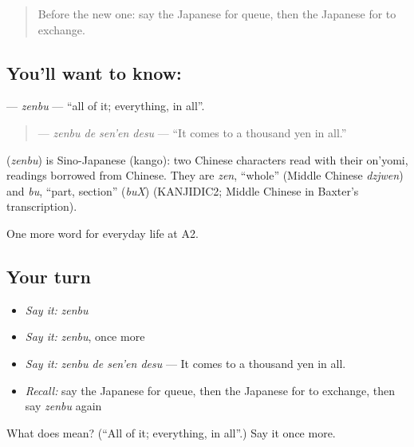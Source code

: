 \begin{quote}
Before the new one: say the Japanese for queue, then the Japanese for to exchange.
\end{quote}

\subsection*{You'll want to know: }
\textbf{} — \emph{zenbu} — \textquotedblleft{}all of it; everything, in all\textquotedblright{}.

\begin{quote}
\textbf{ } — \emph{zenbu de sen'en desu} — \textquotedblleft{}It comes to a thousand yen in all.\textquotedblright{}
\end{quote}

\begin{cousinweb}
\textbf{} (\emph{zenbu}) is Sino-Japanese (kango): two Chinese characters read with their on'yomi, readings borrowed from Chinese. They are \emph{zen}, \textquotedblleft{}whole\textquotedblright{} (Middle Chinese \emph{dzjwen}) and \emph{bu}, \textquotedblleft{}part, section\textquotedblright{} (\emph{buX}) (KANJIDIC2; Middle Chinese in Baxter's transcription).
\end{cousinweb}

\begin{grammarlens}[title={What you've built}]
One more word for everyday life at A2.
\end{grammarlens}

\subsection*{Your turn}
\begin{itemize}
\raggedright
  \item \emph{Say it:} \emph{zenbu}
  \item \emph{Say it:} \emph{zenbu}, once more
  \item \emph{Say it:} \emph{zenbu de sen'en desu} — It comes to a thousand yen in all.
  \item \emph{Recall:} say the Japanese for queue, then the Japanese for to exchange, then say \emph{zenbu} again
\end{itemize}

\begin{tcolorbox}[breakable,colback=teal!4,colframe=teal!35!black,title={Before you move on}]
What does  mean? (\textquotedblleft{}All of it; everything, in all\textquotedblright{}.) Say it once more.
\end{tcolorbox}

